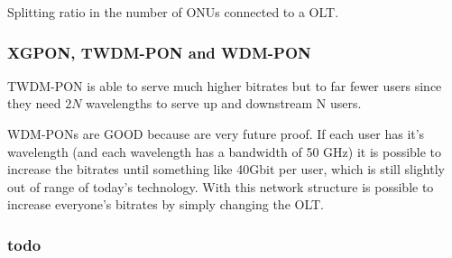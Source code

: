 Splitting ratio in the number of ONUs connected to a OLT.


\subsubsection{XGPON, TWDM-PON and WDM-PON}

TWDM-PON is able to serve much higher bitrates but to far fewer users since they need $2N$ wavelengths to serve up and downstream N users.


WDM-PONs are GOOD because are very future proof. If each user has it's wavelength (and each wavelength has a bandwidth of 50 GHz) it is possible to increase the bitrates until something like 40Gbit per user, which is still slightly out of range of today's technology. With this network structure is possible to increase everyone's bitrates by simply changing the OLT.



\subsubsection{todo}
\begin{comment}
    do the maths for the bitrate in a fibre - ethernet
\end{comment}
